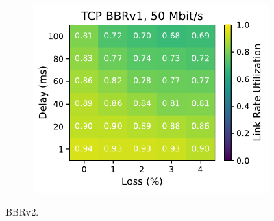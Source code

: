 \begin{figure}[ht]
\begin{subfigure}[b]{1cm}
        \includegraphics[width=\linewidth,trim={8cm 0 0 0},clip]{figures/heatmaps/heatmap_tcp_bbr1_50mbps.pdf}
        \vspace*{0.01cm}
    \end{subfigure}
    \caption{BBRv2.}
\end{figure}

